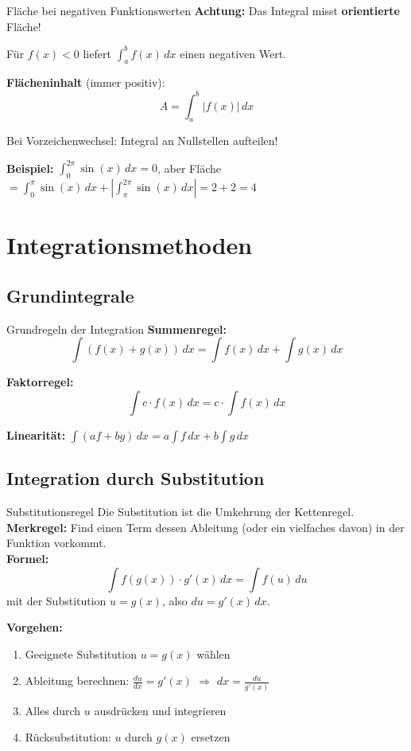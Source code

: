 \documentclass[a4paper,fontsize = 7pt]{scrartcl}
\begin{document}
\begin{subbox}{Fläche bei negativen Funktionswerten}
\textbf{Achtung:} Das Integral misst \textbf{orientierte} Fläche!

Für $f(x) < 0$ liefert $\int_a^b f(x) \, dx$ einen negativen Wert.

\textbf{Flächeninhalt} (immer positiv):
$$A = \int_a^b |f(x)| \, dx$$

Bei Vorzeichenwechsel: Integral an Nullstellen aufteilen!

\textbf{Beispiel:} $\int_0^{2\pi} \sin(x)\,dx = 0$, aber Fläche $= \int_0^{\pi} \sin(x)\,dx + \left|\int_{\pi}^{2\pi} \sin(x)\,dx\right| = 2 + 2 = 4$
\end{subbox}

\section{Integrationsmethoden}

\subsection{Grundintegrale}

\begin{mainbox}{Grundregeln der Integration}
\textbf{Summenregel:}
$$\int (f(x) + g(x))\,dx = \int f(x)\,dx + \int g(x)\,dx$$

\textbf{Faktorregel:}
$$\int c \cdot f(x)\,dx = c \cdot \int f(x)\,dx$$

\textbf{Linearität:} $\int (af + bg)\,dx = a \int f\,dx + b \int g\,dx$
\end{mainbox}

\subsection{Integration durch Substitution}

\begin{mainbox}{Substitutionsregel}
Die Substitution ist die Umkehrung der Kettenregel. \\
\textbf{Merkregel:} Find einen Term dessen Ableitung (oder ein vielfaches davon) in der Funktion vorkommt. \\
\textbf{Formel:}
$$\boxed{\int f(g(x)) \cdot g'(x)\,dx = \int f(u)\,du}$$
mit der Substitution $u = g(x)$, also $du = g'(x)\,dx$.

\textbf{Vorgehen:}
\begin{enumerate}
	\item Geeignete Substitution $u = g(x)$ wählen
	\item Ableitung berechnen: $\frac{du}{dx} = g'(x)$ $\Rightarrow$ $dx = \frac{du}{g'(x)}$
	\item Alles durch $u$ ausdrücken und integrieren
	\item Rücksubstitution: $u$ durch $g(x)$ ersetzen
\end{enumerate}
\end{mainbox}
\end{document}
